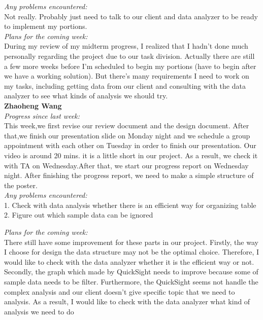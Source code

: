 \noindent\textit{Any problems encountered:}\\
Not really. Probably just need to talk to our client and data analyzer to be ready to implement my portions.\\

\noindent\textit{Plans for the coming week:}\\
During my review of my midterm progress, I realized that I hadn't done much personally regarding the project due to our task division. Actually there are still a few more weeks before I'm scheduled to begin my portions (have to begin after we have a working solution). But there's many requirements I need to work on my tasks, including getting data from our client and consulting with the data analyzer to see what kinds of analysis we should try.\\

\noindent\textbf{Zhaoheng Wang}\\
\noindent\textit{Progress since last week:}\\
This week,we first revise our review document and the design document. After that,we finish our presentation slide on Monday night and we schedule a group appointment with each other on Tuesday in order to finish our presentation. Our video is around 20 mins. it is a little short in our project. As a result, we check it with TA on Wednesday.After that, we start our progress report on Wednesday night. After finishing the progress report, we need to make a simple structure of the poster.\\

\noindent\textit{Any problems encountered:}\\
1. Check with data analysis whether there is an efficient way for organizing table 2. Figure out which sample data can be ignored

\noindent\textit{Plans for the coming week:}\\
There still have some improvement for these parts in our project. Firstly, the way I choose for design the data structure may not be the optimal choice. Therefore, I would like to check with the data analyzer whether it is the efficient way or not. Secondly, the graph which made by QuickSight needs to improve because some of sample data needs to be filter. Furthermore, the QuickSight seems not handle the complex analysis and our client doesn’t give specific topic that we need to analysis. As a result, I would like to check with the data analyzer what kind of analysis we need to do\\

